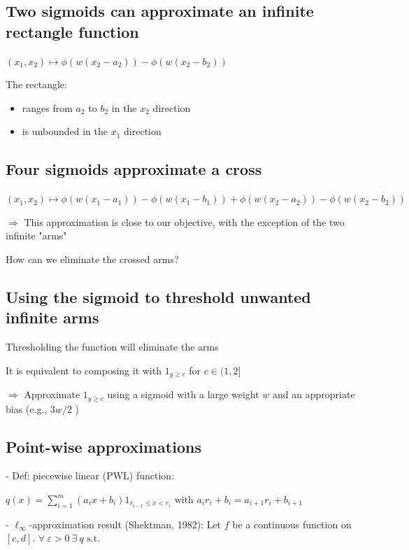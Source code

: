 \subsection*{Two sigmoids can approximate an infinite rectangle function}
$\left(x_{1}, x_{2}\right) \mapsto \phi\left(w\left(x_{2}-a_{2}\right)\right)-\phi\left(w\left(x_{2}-b_{2}\right)\right)$

The rectangle:

\begin{itemize}
  \item ranges from $a_{2}$ to $b_{2}$ in the $x_{2}$ direction
  \item is unbounded in the $x_{1}$ direction

\end{itemize}

\subsection*{Four sigmoids approximate a cross}
$\left(x_{1}, x_{2}\right) \mapsto \phi\left(w\left(x_{1}-a_{1}\right)\right)-\phi\left(w\left(x_{1}-b_{1}\right)\right)+\phi\left(w\left(x_{2}-a_{2}\right)\right)-\phi\left(w\left(x_{2}-b_{2}\right)\right)$

$\Rightarrow$ This approximation is close to our objective, with the exception of the two infinite "arms"


How can we eliminate the crossed arms?

\subsection*{Using the sigmoid to threshold unwanted infinite arms}
Thresholding the function will eliminate the arms

It is equivalent to composing it with $1_{y \geq c}$ for $c \in(1,2]$

$\Rightarrow$ Approximate $1_{y \geq c}$ using a sigmoid with a large weight $w$ and an appropriate bias (e.g., $3 w / 2$ )


\subsection*{Point-wise approximations}
- Def: piecewise linear (PWL) function:

$
q(x)=\sum_{i=1}^{m}\left(a_{i} x+b_{i}\right) 1_{r_{i-1} \leq x<r_{i}} \text { with } a_{i} r_{i}+b_{i}=a_{i+1} r_{i}+b_{i+1}
$

- $\ell_{\infty}$-approximation result (Shektman, 1982): Let $f$ be a continuous function on $[c, d]$. $\forall \ \varepsilon>0 \ \exists \ q \text{ s.t.}$

